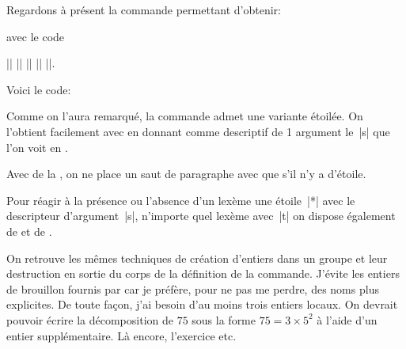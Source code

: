 Regardons à présent la commande permettant d'obtenir:
 \qquad {} \qquad
{}
\par\noindent
avec le code
\par\noindent
|| |\qquad| || |\qquad| ||.

Voici le code: 

Comme on l'aura remarqué, la commande  admet
une variante étoilée. On l'obtient facilement avec
 en donnant comme descriptif de 1\ier
argument le~|s| que l'on voit en .

Avec  de la , on ne place un saut de
paragraphe \TO avec \TF que s'il n'y a 
d'étoile.

Pour réagir à la présence ou l'absence d'un lexème \TO une étoile~|*|
avec le descripteur d'argument~|s|, n'importe quel lexème avec~|t| \TF
on dispose également de  et de .

On retrouve les mêmes techniques de création d'\glspl{entier} dans un
groupe et leur destruction en sortie du corps de la définition de la
commande. J'évite les entiers de brouillon fournis par \Expliii{} car
je préfère, pour ne pas me perdre, des noms plus explicites. De toute
façon, j'ai besoin d'au moins trois entiers locaux. On devrait pouvoir
écrire la décomposition de \(75\) sous la forme \(75=3\times5^{2}\) à
l'aide d'un \gls{entier} supplémentaire. Là encore, l'exercice etc.


